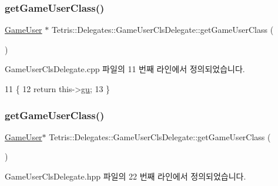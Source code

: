 \subsubsection{\texorpdfstring{get\+Game\+User\+Class()}{getGameUserClass()}\hspace{0.1cm}{\footnotesize\ttfamily [1/2]}}
{\footnotesize\ttfamily \hyperlink{class_tetris_1_1_users_1_1_game_user}{Game\+User} $\ast$ Tetris\+::\+Delegates\+::\+Game\+User\+Cls\+Delegate\+::get\+Game\+User\+Class (\begin{DoxyParamCaption}{ }\end{DoxyParamCaption})}



Game\+User\+Cls\+Delegate.\+cpp 파일의 11 번째 라인에서 정의되었습니다.


\begin{DoxyCode}
11                                                                \{
12                         \textcolor{keywordflow}{return} this->\hyperlink{class_tetris_1_1_delegates_1_1_game_user_cls_delegate_affeaedfa26fa58ee383fff43692f6709}{gu};
13                     \}
\end{DoxyCode}
\mbox{\label{class_tetris_1_1_delegates_1_1_game_user_cls_delegate_aabfee2bf7c1db3686109f31a5db9f5b4}} 
\subsubsection{\texorpdfstring{get\+Game\+User\+Class()}{getGameUserClass()}\hspace{0.1cm}{\footnotesize\ttfamily [2/2]}}
{\footnotesize\ttfamily \hyperlink{class_tetris_1_1_users_1_1_game_user}{Game\+User}$\ast$ Tetris\+::\+Delegates\+::\+Game\+User\+Cls\+Delegate\+::get\+Game\+User\+Class (\begin{DoxyParamCaption}{ }\end{DoxyParamCaption})\hspace{0.3cm}{\ttfamily [inline]}}



Game\+User\+Cls\+Delegate.\+hpp 파일의 22 번째 라인에서 정의되었습니다.


